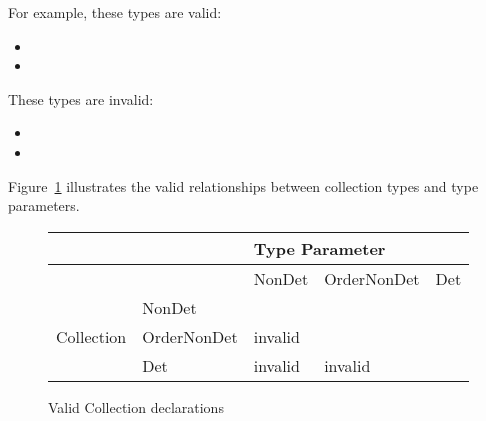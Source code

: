 For example, these types are valid:
\begin{itemize}
    \item {}
    \item {}\code{>}
\end{itemize}

These types are invalid:
  \begin{itemize}
    \item {}
    \item {}
  \end{itemize}

Figure~\ref{fig-determinism-collections} illustrates the valid
relationships between collection types and type parameters.

\begin{figure}
  \centering
  \begin{tabular}{|l|l|l|l|l|}
    \hline
    &   &  \multicolumn{3}{l|}{Type Parameter}                                                                       \\ \hline
    &             & NonDet                                     & OrderNonDet              & Det \\ \cline{2-5}
              & NonDet &                                                 &                          &     \\ \cline{2-5}
Collection    & OrderNonDet &   invalid  &                          &     \\ \cline{2-5}
              & Det         &   invalid               &    invalid  &     \\ \hline
  \end{tabular}
  \caption{Valid Collection declarations}
  \label{fig-determinism-collections}
\end{figure}






